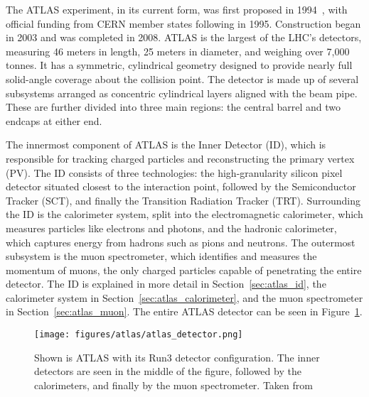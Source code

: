The ATLAS experiment, in its current form, was first proposed in 1994~\cite{atlas_technical_proposal}, with official funding from CERN member states following in 1995. Construction began in 2003 and was completed in 2008. ATLAS is the largest of the LHC's detectors, measuring 46 meters in length, 25 meters in diameter, and weighing over 7,000 tonnes. It has a symmetric, cylindrical geometry designed to provide nearly full solid-angle coverage about the collision point. The detector is made up of several subsystems arranged as concentric cylindrical layers aligned with the beam pipe. These are further divided into three main regions: the central barrel and two endcaps at either end.

The innermost component of ATLAS is the Inner Detector (ID), which is responsible for tracking charged particles and reconstructing the primary vertex (PV). The ID consists of three technologies: the high-granularity silicon pixel detector situated closest to the interaction point, followed by the Semiconductor Tracker (SCT), and finally the Transition Radiation Tracker (TRT). Surrounding the ID is the calorimeter system, split into the electromagnetic calorimeter, which measures particles like electrons and photons, and the hadronic calorimeter, which captures energy from hadrons such as pions and neutrons. The outermost subsystem is the muon spectrometer, which identifies and measures the momentum of muons, the only charged particles capable of penetrating the entire detector.
The ID is explained in more detail in Section~\ref{sec:atlas_id}, the calorimeter system in Section~\ref{sec:atlas_calorimeter}, and the muon spectrometer in Section~\ref{sec:atlas_muon}. The entire ATLAS detector can be seen in Figure~\ref{fig:atlas_detector}.

\begin{figure}[pht]
    \centering
    \texttt{[image: figures/atlas/atlas\_detector.png]}
    \caption{Shown is ATLAS with its Run3 detector configuration. The inner detectors are seen in the middle of the figure, followed by the calorimeters, and finally by the muon spectrometer. Taken from~\cite{atlas_figure}}\label{fig:atlas_detector}
\end{figure}